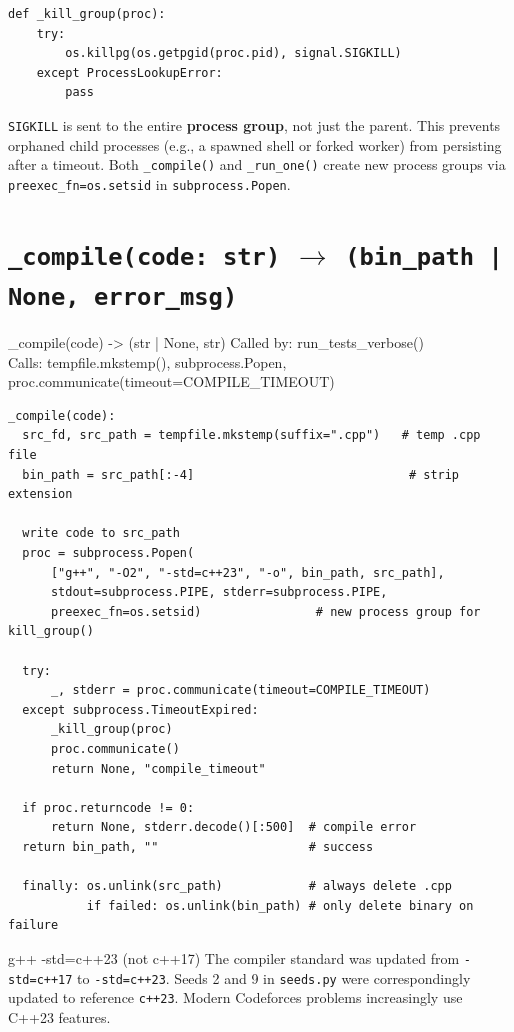 \documentclass[11pt,a4paper]{report}
\newcommand{\fn}[1]{\texttt{#1}}
\begin{document}
\begin{lstlisting}[style=py]
def _kill_group(proc):
    try:
        os.killpg(os.getpgid(proc.pid), signal.SIGKILL)
    except ProcessLookupError:
        pass
\end{lstlisting}

\fn{SIGKILL} is sent to the entire \textbf{process group}, not just the parent.
This prevents orphaned child processes (e.g., a spawned shell or forked worker)
from persisting after a timeout.  Both \fn{\_compile()} and \fn{\_run\_one()}
create new process groups via \fn{preexec\_fn=os.setsid} in \fn{subprocess.Popen}.

\section{\fn{\_compile(code: str)} $\to$ \fn{(bin\_path | None, error\_msg)}}

\begin{spec}{\_compile(code) -> (str | None, str)}
Called by: run\_tests\_verbose() \\
Calls: tempfile.mkstemp(), subprocess.Popen, proc.communicate(timeout=COMPILE\_TIMEOUT)
\end{spec}

\begin{lstlisting}[style=chain]
_compile(code):
  src_fd, src_path = tempfile.mkstemp(suffix=".cpp")   # temp .cpp file
  bin_path = src_path[:-4]                              # strip extension

  write code to src_path
  proc = subprocess.Popen(
      ["g++", "-O2", "-std=c++23", "-o", bin_path, src_path],
      stdout=subprocess.PIPE, stderr=subprocess.PIPE,
      preexec_fn=os.setsid)                # new process group for kill_group()

  try:
      _, stderr = proc.communicate(timeout=COMPILE_TIMEOUT)
  except subprocess.TimeoutExpired:
      _kill_group(proc)
      proc.communicate()
      return None, "compile_timeout"

  if proc.returncode != 0:
      return None, stderr.decode()[:500]  # compile error
  return bin_path, ""                     # success

  finally: os.unlink(src_path)            # always delete .cpp
           if failed: os.unlink(bin_path) # only delete binary on failure
\end{lstlisting}

\begin{warn}{g++ -std=c++23 (not c++17)}
The compiler standard was updated from \fn{-std=c++17} to \fn{-std=c++23}.
Seeds 2 and 9 in \fn{seeds.py} were correspondingly updated to reference \fn{c++23}.
Modern Codeforces problems increasingly use C++23 features.
\end{warn}
\end{document}

